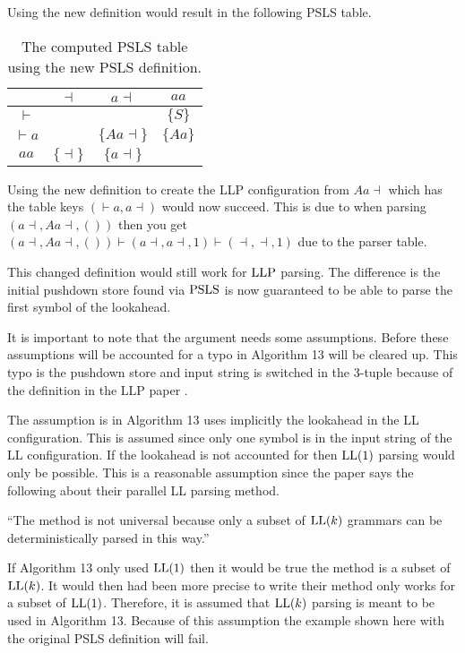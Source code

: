 Using the new definition would result in the following PSLS table.
\begin{table}[H]
    \centering
    \begin{tabular}{c|c|c|c}
        & $\dashv$ & $a\dashv$ & $aa$ \\ \hline
        $\vdash$ & & & $\{S\}$ \\\hline
        $\vdash a$ & & $\{Aa\dashv\}$ & $\{Aa\}$ \\\hline
        $aa$ & $\{\dashv\}$ & $\{a\dashv\}$ & 
    \end{tabular}
    \caption{The computed PSLS table using the new PSLS definition.}
\end{table}
\noindent Using the new definition to create the LLP configuration from $Aa\dashv$ which has the table keys $(\vdash a,a \dashv)$ would now succeed. This is due to when parsing $(a \dashv, Aa\dashv, ())$ then you get $(a \dashv, Aa\dashv, ()) \vdash (a \dashv, a\dashv, 1) \vdash ( \dashv, \dashv, 1)$ due to the parser table.

This changed definition would still work for $\text{LLP}$ parsing. The difference is the initial pushdown store found via $\text{PSLS}$ is now guaranteed to be able to parse the first symbol of the lookahead.

It is important to note that the argument needs some assumptions. Before these assumptions will be accounted for a typo in Algorithm 13 will be cleared up. This typo is the pushdown store and input string is switched in the 3-tuple because of the definition in the LLP paper \cite[5]{Vagner2007}.

The assumption is in Algorithm 13 uses implicitly the lookahead in the LL configuration. This is assumed since only one symbol is in the input string of the LL configuration. If the lookahead is not accounted for then $\text{LL}(1)$ parsing would only be possible. This is a reasonable assumption since the paper says the following about their parallel LL parsing method.
\begin{center}
    ``The method is not universal because only a subset of $\text{LL}(k)$ grammars can be deterministically parsed in this way.'' \cite[2]{Vagner2007}
\end{center}
If Algorithm 13 only used $\text{LL}(1)$ then it would be true the method is a subset of $\text{LL}(k)$. It would then had been more precise to write their method only works for a subset of $\text{LL}(1)$. Therefore, it is assumed that $\text{LL}(k)$ parsing is meant to be used in Algorithm 13. Because of this assumption the example shown here with the original PSLS definition will fail.

